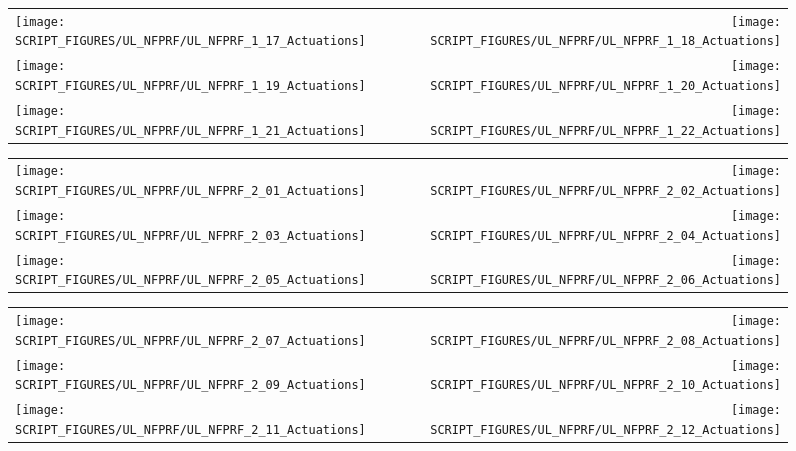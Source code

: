 \begin{figure}[p]
\begin{tabular*}{\textwidth}{l@{\extracolsep{\fill}}r}
\texttt{[image: SCRIPT\_FIGURES/UL\_NFPRF/UL\_NFPRF\_1\_17\_Actuations]} &
\texttt{[image: SCRIPT\_FIGURES/UL\_NFPRF/UL\_NFPRF\_1\_18\_Actuations]} \\
\texttt{[image: SCRIPT\_FIGURES/UL\_NFPRF/UL\_NFPRF\_1\_19\_Actuations]} &
\texttt{[image: SCRIPT\_FIGURES/UL\_NFPRF/UL\_NFPRF\_1\_20\_Actuations]} \\
\texttt{[image: SCRIPT\_FIGURES/UL\_NFPRF/UL\_NFPRF\_1\_21\_Actuations]} &
\texttt{[image: SCRIPT\_FIGURES/UL\_NFPRF/UL\_NFPRF\_1\_22\_Actuations]}
\end{tabular*}
\label{UL_NFPRF_3}
\end{figure}



\begin{figure}[p]
\begin{tabular*}{\textwidth}{l@{\extracolsep{\fill}}r}
\texttt{[image: SCRIPT\_FIGURES/UL\_NFPRF/UL\_NFPRF\_2\_01\_Actuations]} &
\texttt{[image: SCRIPT\_FIGURES/UL\_NFPRF/UL\_NFPRF\_2\_02\_Actuations]} \\
\texttt{[image: SCRIPT\_FIGURES/UL\_NFPRF/UL\_NFPRF\_2\_03\_Actuations]} &
\texttt{[image: SCRIPT\_FIGURES/UL\_NFPRF/UL\_NFPRF\_2\_04\_Actuations]} \\
\texttt{[image: SCRIPT\_FIGURES/UL\_NFPRF/UL\_NFPRF\_2\_05\_Actuations]} &
\texttt{[image: SCRIPT\_FIGURES/UL\_NFPRF/UL\_NFPRF\_2\_06\_Actuations]}
\end{tabular*}
\label{UL_NFPRF_2_1}
\end{figure}

\begin{figure}[p]
\begin{tabular*}{\textwidth}{l@{\extracolsep{\fill}}r}
\texttt{[image: SCRIPT\_FIGURES/UL\_NFPRF/UL\_NFPRF\_2\_07\_Actuations]} &
\texttt{[image: SCRIPT\_FIGURES/UL\_NFPRF/UL\_NFPRF\_2\_08\_Actuations]} \\
\texttt{[image: SCRIPT\_FIGURES/UL\_NFPRF/UL\_NFPRF\_2\_09\_Actuations]} &
\texttt{[image: SCRIPT\_FIGURES/UL\_NFPRF/UL\_NFPRF\_2\_10\_Actuations]} \\
\texttt{[image: SCRIPT\_FIGURES/UL\_NFPRF/UL\_NFPRF\_2\_11\_Actuations]} &
\texttt{[image: SCRIPT\_FIGURES/UL\_NFPRF/UL\_NFPRF\_2\_12\_Actuations]}
\end{tabular*}
\label{UL_NFPRF_2_2}
\end{figure}

